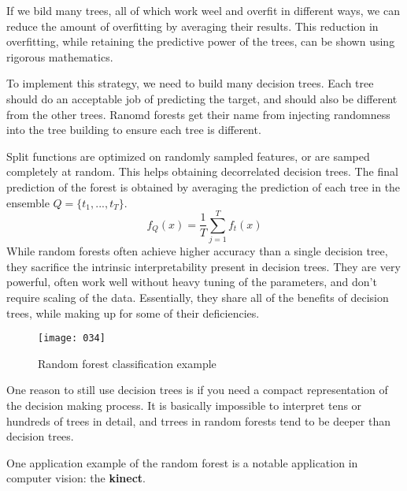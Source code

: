 If we bild many trees, all of which work weel and overfit in different ways, we can reduce the amount of overfitting by averaging their results. This reduction in overfitting, while retaining the predictive power of the trees, can be shown using rigorous mathematics.

To implement this strategy, we need to build many decision trees. Each tree should do an acceptable job of predicting the target, and should also be different from the other trees. Ranomd forests get their name from injecting randomness into the tree building to ensure each tree is different.

Split functions are optimized on randomly sampled features, or are samped completely at random. This helps obtaining decorrelated decision trees. The final prediction of the forest is obtained by averaging the prediction of each tree in the ensemble \(Q = \{t_1,...,t_T\}\).
\begin{equation}
    f_Q(x) = \frac 1 T \sum_{j=1}^T f_t(x)
\end{equation}
While random forests often achieve higher accuracy than a single decision tree, they sacrifice the intrinsic interpretability present in decision trees. They are very powerful, often work well without heavy tuning of the parameters, and don't require scaling of the data. Essentially, they share all of the benefits of decision trees, while making up for some of their deficiencies.

\begin{figure}[t]
\begin{center}
    \texttt{[image: 034]}
\end{center}
\caption{Random forest classification example}
\label{fig:034}
\end{figure}

One reason to still use decision trees is if you need a compact representation of the decision making process. It is basically impossible to interpret tens or hundreds of trees in detail, and trrees in random forests tend to be deeper than decision trees.

One application example of the random forest is a notable application in computer vision: the \textbf{kinect}.